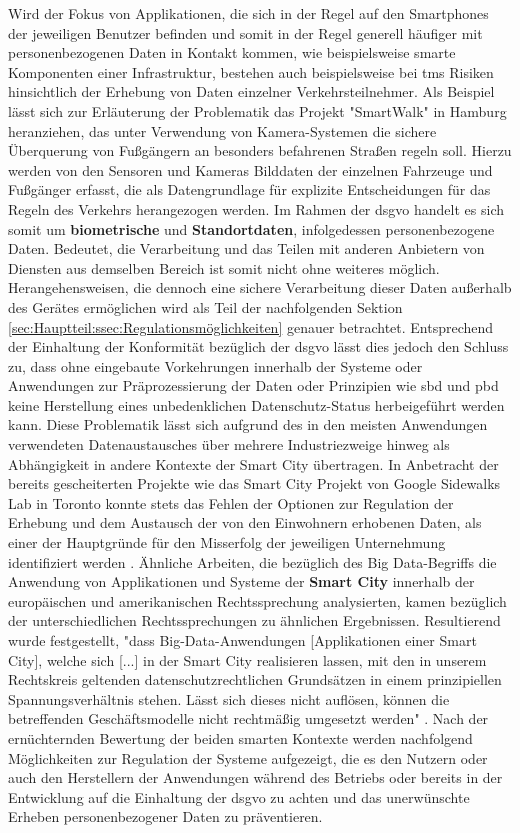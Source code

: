 Wird der Fokus von Applikationen, die sich in der Regel auf den Smartphones der jeweiligen Benutzer befinden und somit in der Regel generell häufiger mit personenbezogenen Daten in Kontakt kommen, wie beispielsweise smarte Komponenten einer Infrastruktur, bestehen auch beispielsweise bei \ac{tms} Risiken hinsichtlich der Erhebung von Daten einzelner Verkehrsteilnehmer.
Als Beispiel lässt sich zur Erläuterung der Problematik das Projekt "SmartWalk" \cite{SmartWalk2022} in Hamburg heranziehen, das unter Verwendung von Kamera-Systemen die sichere Überquerung von Fußgängern an besonders befahrenen Straßen regeln soll. Hierzu werden von den Sensoren und Kameras Bilddaten der einzelnen Fahrzeuge und Fußgänger erfasst, die als Datengrundlage für explizite Entscheidungen für das Regeln des Verkehrs herangezogen werden. Im Rahmen der \ac{dsgvo} handelt es sich somit um \textbf{biometrische} und \textbf{Standortdaten}, infolgedessen personenbezogene Daten. Bedeutet, die Verarbeitung und das Teilen mit anderen Anbietern von Diensten aus demselben Bereich ist somit nicht ohne weiteres möglich. Herangehensweisen, die dennoch eine sichere Verarbeitung dieser Daten außerhalb des Gerätes ermöglichen wird als Teil der nachfolgenden Sektion \ref{sec:Hauptteil:ssec:Regulationsmöglichkeiten} genauer betrachtet. 
Entsprechend der Einhaltung der Konformität bezüglich der \ac{dsgvo} lässt dies jedoch den Schluss zu, dass ohne eingebaute Vorkehrungen innerhalb der Systeme oder Anwendungen zur Präprozessierung der Daten oder Prinzipien wie \ac{sbd} und \ac{pbd} keine Herstellung eines unbedenklichen Datenschutz-Status herbeigeführt werden kann. 
Diese Problematik lässt sich aufgrund des in den meisten Anwendungen verwendeten Datenaustausches über mehrere Industriezweige hinweg \cite{BCG2020} als Abhängigkeit in andere Kontexte der Smart City übertragen.
In Anbetracht der bereits gescheiterten Projekte wie das Smart City Projekt von Google Sidewalks Lab in Toronto \cite{SidewalkToronto2022} konnte stets das Fehlen der Optionen zur Regulation der Erhebung und dem Austausch der von den Einwohnern erhobenen Daten, als einer der Hauptgründe für den Misserfolg der jeweiligen Unternehmung identifiziert werden \cite{Bernier2022}.
Ähnliche Arbeiten, die bezüglich des Big Data-Begriffs die Anwendung von Applikationen und Systeme der \textbf{Smart City} innerhalb der europäischen und amerikanischen Rechtssprechung analysierten, kamen bezüglich der unterschiedlichen Rechtssprechungen zu ähnlichen Ergebnissen.
Resultierend wurde festgestellt, "dass Big-Data-Anwendungen [Applikationen einer Smart City], welche sich [...] in der Smart City realisieren lassen, mit den in unserem Rechtskreis geltenden datenschutzrechtlichen Grundsätzen in einem prinzipiellen Spannungsverhältnis stehen. Lässt sich dieses nicht auflösen, können die betreffenden Geschäftsmodelle nicht rechtmäßig umgesetzt werden" \cite[p.~45]{Sennhauser2019}. Nach der ernüchternden Bewertung der beiden smarten Kontexte werden nachfolgend Möglichkeiten zur Regulation der Systeme aufgezeigt, die es den Nutzern oder auch den Herstellern der Anwendungen während des Betriebs oder bereits in der Entwicklung auf die Einhaltung der \ac{dsgvo} zu achten und das unerwünschte Erheben personenbezogener Daten zu präventieren.

